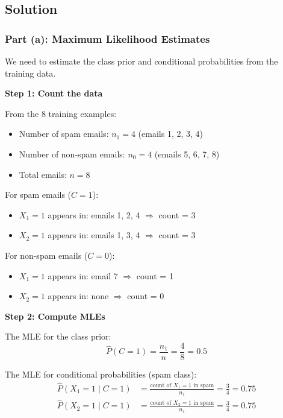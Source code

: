 \documentclass[12pt]{article}
\begin{document}
\subsection{Solution}

\subsubsection{Part (a): Maximum Likelihood Estimates}

\begin{solution}
We need to estimate the class prior and conditional probabilities from the training data.

\textbf{Step 1: Count the data}

From the 8 training examples:
\begin{itemize}
    \item Number of spam emails: $n_1 = 4$ (emails 1, 2, 3, 4)
    \item Number of non-spam emails: $n_0 = 4$ (emails 5, 6, 7, 8)
    \item Total emails: $n = 8$
\end{itemize}

For spam emails ($C = 1$):
\begin{itemize}
    \item $X_1 = 1$ appears in: emails 1, 2, 4 $\Rightarrow$ count = 3
    \item $X_2 = 1$ appears in: emails 1, 3, 4 $\Rightarrow$ count = 3
\end{itemize}

For non-spam emails ($C = 0$):
\begin{itemize}
    \item $X_1 = 1$ appears in: email 7 $\Rightarrow$ count = 1
    \item $X_2 = 1$ appears in: none $\Rightarrow$ count = 0
\end{itemize}

\textbf{Step 2: Compute MLEs}

The MLE for the class prior:
\[
\hat{P}(C = 1) = \frac{n_1}{n} = \frac{4}{8} = 0.5
\]

The MLE for conditional probabilities (spam class):
\begin{align}
\hat{P}(X_1 = 1 \mid C = 1) &= \frac{\text{count of } X_1 = 1 \text{ in spam}}{n_1} = \frac{3}{4} = 0.75 \\
\hat{P}(X_2 = 1 \mid C = 1) &= \frac{\text{count of } X_2 = 1 \text{ in spam}}{n_1} = \frac{3}{4} = 0.75
\end{align}


\end{solution}
\end{document}
